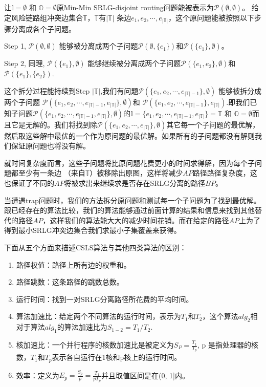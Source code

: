 让$\mathbb{I}=\emptyset$ 和 ${\mathbb{O}}=\emptyset$原Min-Min SRLG-disjoint routing问题能被表示为$\mathcal{P}(\emptyset,\emptyset)$。 给定风险链路组冲突边集合$\mathbb{T}$，$\mathbb{T}$有$|\mathbb{T}|$ 条边${e_1},{e_2}, \cdots ,{e_{\left| \mathbb{T} \right|}}$，这个原问题能被按照以下步骤分离成各个子问题。

Step 1, $\mathcal{P}(\emptyset,\emptyset)$ 能够被分离成两个子问题$\mathcal{P}(\emptyset,\{e_1\})$和$\mathcal{P}(\{e_1\},\emptyset)$。

Step 2, 同理, $\mathcal{P}(\{e_1\},\emptyset)$ 能够继续被分离成两个子问题$\mathcal{P}(\{e_1,e_2\},\emptyset)$和$\mathcal{P}(\{e_1\},\{e_2\})$.

这个拆分过程能持续到Step $|\mathbb{T}|$,我们有问题$\mathcal{P}(\{e_1,e_2,\cdots ,{e_{\left| \mathbb{T} \right|-1}}\},\emptyset)$ 能够被拆分成两个子问题 $\mathcal{P}(\{e_1,e_2,\cdots ,{e_{\left| \mathbb{T} \right|-1}}, {e_{\left| \mathbb{T} \right|}}\},\emptyset)$和 $\mathcal{P}(\{e_1,e_2,\cdots ,{e_{\left| \mathbb{T} \right|-1}}\},{e_{\left| \mathbb{T} \right|}})$.即我们已知子问题$\mathcal{P}(\{e_1,e_2,\cdots ,{e_{\left| \mathbb{T} \right|-1}}, {e_{\left| \mathbb{T} \right|}}\},\emptyset)$的${\mathbb{I}=\{e_1,e_2,\cdots ,{e_{\left| \mathbb{T} \right|-1}}, {e_{\left| \mathbb{T} \right|}}\}}=\mathbb{T}$ 和 ${\mathbb{O}}=\emptyset$而且它是无解的。我们将找到除$\mathcal{P}(\{e_1,e_2,\cdots ,{e_{\left| \mathbb{T} \right|}}\},\emptyset)$其它每一个子问题的最优解，然后取这些解中最优的一个作为原问题的最优解。如果所有的子问题都没有解则我们保证原问题也将没有解。

就时间复杂度而言，这些子问题将比原问题花费更小的时间求得解，因为每个子问题都至少有一条边 （来自$\mathbb{T}$）被移除出原图，这样将减少$AP$路径路径复杂度，这也保证了不同的$AP$将被求出来继续求是否存在SRLG分离的路径$BP$。

当遭遇trap问题时，我们的方法拆分原问题和测试每一个子问题为了找到最优解。跟已经存在的算法比较，我们的算法能够通过前面计算的结果和信息来找到其他替代的路径$AP$，这样我们的算法能大大的减少时间花销。而在给定的路径$AP$上为了得到最小SRLG冲突边集合我们求最小子集覆盖来获得。

下面从五个方面来描述CSLS算法与其他四类算法的区别：
\begin{enumerate}
  \item 路径权值：路径上所有边的权重和。
  \item 路径跳数：这条路径的跳数总数。
  \item 运行时间：找到一对SRLG分离路径所花费的平均时间。
  \item 算法加速比：给定两个不同算法的运行时间，表示为$T_1$和$T_2$，这个算法$alg_2$相对于算法$alg_1$的算法加速比为${S_{1 - 2}} = T_1/T_2$.
  \item 核加速比：一个并行程序的核数加速比是被定义为$S_P=\frac{T_1}{T_p}$, p 是指处理器的核数，$T_1$和$T_p$表示各自运行在1核和p核上的运行时间。
  \item 效率：定义为$E_p=\frac{S_p}{p}=\frac{T_1}{pT_p}$并且取值区间是在(0, 1]内。
\end{enumerate}

